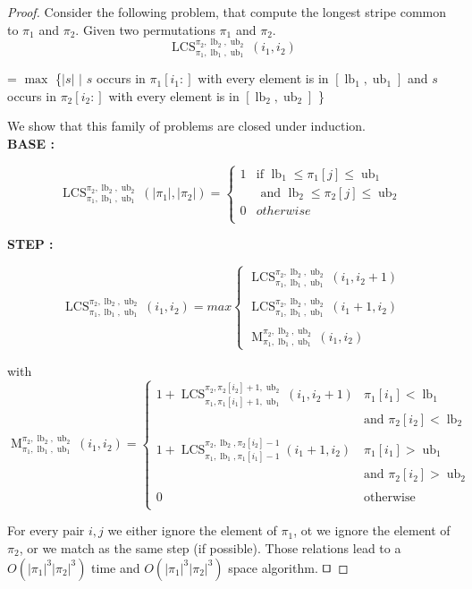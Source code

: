 \documentclass[a4paper]{llncs}
\DeclareMathOperator{\lb}{lb}
\DeclareMathOperator{\ub}{ub}
\DeclareMathOperator{\LCSa}{LCS}
\newcommand{\LCS}[8]{\LCSa_{{#1},{#2},{#3}}^{{#4},{#5},{#6}}({#7},{#8})}
\DeclareMathOperator{\matcha}{M}
\newcommand{\match}[8]{\matcha_{{#1},{#2},{#3}}^{{#4},{#5},{#6}}({#7},{#8})}
\begin{document}
\begin{proof}
Consider the following problem,
that compute the longest stripe common to $\pi_1$ and $\pi_2$.
Given two permutations $\pi_1$ and $\pi_2$.\\

$$
\LCS{\pi_1}{\lb_1}{\ub_1}{\pi_2}{\lb_2}{\ub_2}{i_1}{i_2}
$$
\begin{center}
= $\max$ \{$|s|$ $|$ $s$ occurs in $\pi_1[i_1:]$ with every element is in $[\lb_1,\ub_1]$ and $s$ occurs in $\pi_2[i_2:]$ with every element is in $[\lb_2,\ub_2]$ \}
\end{center}



We show that this family of problems are closed under induction.\\


\noindent\textbf{BASE :}

$$
\LCS{\pi_1}{\lb_1}{\ub_1}{\pi_2}{\lb_2}{\ub_2}{|\pi_1|}{|\pi_2|} =
\begin{cases}
	1 & \text{if $\lb_1 \leq \pi_1[j] \leq \ub_1$
	}\\
	& \text{ and $\lb_2 \leq \pi_2[j] \leq \ub_2$}\\
	0 & otherwise\\
\end{cases}
$$

\noindent\textbf{STEP :}

$$
\LCS{\pi_1}{\lb_1}{\ub_1}{\pi_2}{\lb_2}{\ub_2}{i_1}{i_2}=max
\begin{cases}
	\LCS{\pi_1}{\lb_1}{\ub_1}{\pi_2}{\lb_2}{\ub_2}{i_1}{i_2+1} \\
	\\
	\LCS{\pi_1}{\lb_1}{\ub_1}{\pi_2}{\lb_2}{\ub_2}{i_1+1}{i_2} \\
	\\
	\match{\pi_1}{\lb_1}{\ub_1}{\pi_2}{\lb_2}{\ub_2}{i_1}{i_2}
\end{cases}
$$

with \\
$
\match{\pi_1}{\lb_1}{\ub_1}{\pi_2}{\lb_2}{\ub_2}{i_1}{i_2}=
\begin{cases}
1+\LCS{\pi_1}{\pi_1[i_1]+1}{\ub_1}{\pi_2}{\pi_2[i_2]+1}{\ub_2}{i_1}{i_2+1}
	& \text{$\pi_1[i_1]<\lb_1$ } \\
	& \text{and $\pi_2[i_2]<\lb_2$} \\

&\\

1+\LCS{\pi_1}{\lb_1}{\pi_1[i_1]-1}{\pi_2}{\lb_2}{\pi_2[i_2]-1}{i_1+1}{i_2}
	& \text{$\pi_1[i_1]>\ub_1$ } \\
	&\text{and $\pi_2[i_2]>\ub_2$}\\

&\\

0 	& \text{otherwise}\\
\end{cases}
$


For every pair $i,j$ we either ignore the element of $\pi_1$,
ot we ignore the element of $\pi_2$,
or we match as the same step (if possible).
Those relations lead to a $O(|\pi_1|^3|\pi_2|^3)$ time and $O(|\pi_1|^3|\pi_2|^3)$ space algorithm.
$\qed$
\end{proof}


{}

\end{document}
